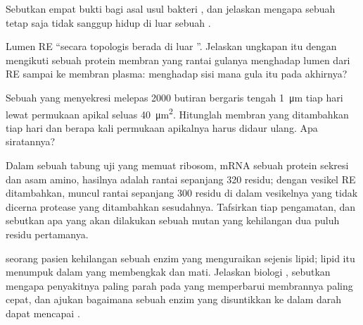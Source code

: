 \begin{exercise}[$\star\star$]\label{exo:b1:eukaryotic-cell:7}
Sebutkan empat bukti bagi asal usul bakteri , dan jelaskan
mengapa sebuah  tetap saja tidak sanggup hidup di luar
sebuah .
\end{exercise}

\begin{exercise}[$\star\star$]\label{exo:b1:eukaryotic-cell:8}
Lumen RE ``secara topologis berada di luar ''. Jelaskan ungkapan itu
dengan mengikuti sebuah protein membran yang rantai gulanya menghadap
lumen dari RE sampai ke membran plasma: menghadap sisi mana gula itu
pada akhirnya?
\end{exercise}

\begin{exercise}[$\star\star$]\label{exo:b1:eukaryotic-cell:9}
Sebuah  yang menyekresi melepas \qty{2000}{} butiran bergaris tengah
\qty{1}{\micro m} tiap hari lewat permukaan apikal seluas
\qty{40}{\micro m^2}. Hitunglah membran yang ditambahkan tiap hari dan
berapa kali permukaan apikalnya harus didaur ulang. Apa siratannya?
\end{exercise}

\begin{exercise}[$\star\star\star$]\label{exo:b1:eukaryotic-cell:10}
Dalam sebuah tabung uji yang memuat ribosom, mRNA sebuah protein
sekresi dan asam amino, hasilnya adalah rantai sepanjang \qty{320}{}
residu; dengan vesikel RE ditambahkan, muncul rantai sepanjang
\qty{300}{} residu di dalam vesikelnya yang tidak dicerna protease yang
ditambahkan sesudahnya. Tafsirkan tiap pengamatan, dan sebutkan apa
yang akan dilakukan sebuah mutan yang kehilangan dua puluh residu
pertamanya.
\end{exercise}

\begin{exercise}[$\star\star\star$]\label{exo:b1:eukaryotic-cell:11}
 seorang pasien kehilangan sebuah enzim  yang menguraikan
sejenis lipid; lipid itu menumpuk dalam  yang membengkak dan
 mati. Jelaskan biologi , sebutkan mengapa penyakitnya
paling parah pada  yang memperbarui membrannya paling cepat, dan
ajukan bagaimana sebuah enzim yang disuntikkan ke dalam darah dapat
mencapai .
\end{exercise}

